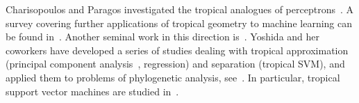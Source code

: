 \documentclass{article}
\begin{document}
Charisopoulos and Paragos investigated the tropical analogues
of perceptrons~\cite{Charisopoulos2017}.
A survey covering further applications of tropical geometry to machine learning
can be found in~\cite{maragos2021}. Another seminal work in this direction is~\cite{zhang2018}.
Yoshida and her coworkers have developed a series of studies
dealing with tropical approximation (principal component analysis~\cite{yoshida2019},
regression)
and separation (tropical SVM), and applied them to problems of phylogenetic analysis,
see~\cite{monod2022}. In particular, tropical support vector machines are studied
in~\cite{tang2020,Yoshida2023}.

\end{document}
